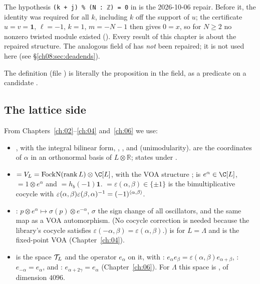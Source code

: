 \begin{warning}
The hypothesis \texttt{(k + j) \% (N : ℤ) = 0} in  is the 2026-10-06 repair.  Before
it, the identity was required for all $k$, including $k$ off the support of $u$; the certificate
$u=v=\mathbf 1$, $\ell=-1$, $k=1$, $m=-N-1$ then gives $0=x$, so for $N\ge2$ no nonzero twisted
module existed ().  Every result of this chapter is about the
repaired structure.  The analogous field of  has \emph{not} been
repaired; it is not used here (see \S\ref{ch08:sec:deadends}).
\end{warning}

The definition  (file
) is literally the proposition in the
 field, as a predicate on a candidate .

\subsection{The lattice side}
From Chapters~\ref{ch:02}--\ref{ch:04} and~\ref{ch:06} we use:
\begin{itemize}
\item {}, with  the integral bilinear form,
  , , and  (unimodularity).
   are the coordinates of $\alpha$ in an orthonormal basis
  of $L\otimes\mathbb{R}$;  states
   under .
\item {} $=V_L=\mathrm{FockN}(\mathrm{rank}\,L)\otimes\C[L]$, with the VOA
  structure ;  is $e^\alpha\in\C[L]$,
   $=1\otimes e^\alpha$ and  $=h_b(-1)\mathbf 1$.
   $=\varepsilon(\alpha,\beta)\in\{\pm1\}$ is the bimultiplicative
  cocycle with $\varepsilon(\alpha,\beta)\varepsilon(\beta,\alpha)^{-1}=(-1)^{\langle \alpha,\beta\rangle}$.
\item {}: $p\otimes e^\alpha\mapsto\sigma(p)\otimes e^{-\alpha}$, $\sigma$ the sign
  change of all oscillators, and  the same map as a VOA automorphism.
  (No cocycle correction is needed because the library's cocycle satisfies
  $\varepsilon(-\alpha,\beta)=\varepsilon(\alpha,\beta)$.)
   is  for $L=\Lambda$ and  is the
  fixed-point VOA  (Chapter~\ref{ch:04}).
\item {} is the space $\mathcal{T}_L$ and
   the operator $e_\alpha$ on it, with
  : $e_\alpha e_\beta=\varepsilon(\alpha,\beta)e_{\alpha+\beta}$, :
  $e_{-\alpha}=e_\alpha$, and : $e_{\alpha+2\gamma}=e_\alpha$
  (Chapter~\ref{ch:06}).  For $\Lambda$ this space is , of dimension $4096$.
\end{itemize}

